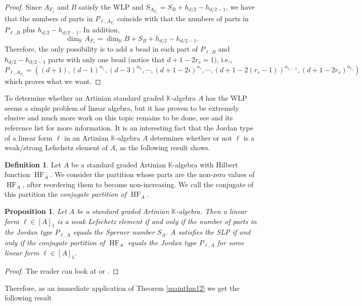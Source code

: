 \documentclass[12pt,twoside]{amsart}
\numberwithin{equation}{section} \hyphenation{semi-stable}
\newcommand{\K}{\mathbb{K}}
\DeclareMathOperator{\HF}{HF}
\newtheorem{proposition}[theorem]{Proposition}
\theoremstyle{definition}
\newtheorem{definition}[theorem]{Definition}
\begin{document}
\begin{proof}
Since $A_{F_s}$ and $B$ satisfy the WLP and $S_{A_{F_s}}= S_B+ h_{d/2}-h_{d/2 -1}$, we have that the numbers of parts in $P_{\ell, A_{F_s}}$
coincide with that the numbers of parts in $P_{\ell, B}$ plus $h_{d/2}-h_{d/2 -1}$. In addition,
$$
\dim _{\K}A_{F_s}=\dim_{\K}B+S_B+  h_{d/2}-h_{d/2 -1}.$$
Therefore, the only possibility is to add a bead in each part of $ P_{\ell,B}$ and $h_{d/2}-h_{d/2 -1}$ parts with only one bead (notice that $d+1-2r_s=1)$, i.e.,
$$ P_{\ell,A_{F_s}}= ((d+1), (d-1)^{\alpha_1},(d - 3)^{\alpha_2},\cdots,  (d+1-2i)^{\alpha _i}, \cdots , (d+1-2(r_s-1))^{\alpha_{r_s-1}},(d+1-2r_s)^{\alpha_{r_s}})$$
which proves what we want.
\end{proof}

To determine whether an Artinian standard graded $\K$-algebra $A$ has the WLP seems a simple problem of linear algebra, but it has proven to be extremely elusive and much more work on this topic remains to be done, see \cite{JMR} and its reference list for more information. 
It is an interesting fact that the Jordan type of a linear form $\ell$ in an Artinian $\K$-algebra $A$ determines whether or not $\ell$ is a weak/strong Lefschetz element of $A$, as the following result shows.

\begin{definition}
    Let $A$ be a standard graded Artinian $\K$-algebra with Hilbert function $\HF_A$. We consider the partition whose parts are the non-zero values of $\HF_A$, after reordering them to become non-increasing. We call the conjugate of this partition the \emph{conjugate partition of $\HF_A$}.
\end{definition}

\begin{proposition}\label{jordanTypeWLP}
    Let $A$ be a standard graded Artinian $\K$-algebra. Then a linear form $\ell \in [A]_1$ is a weak Lefschetz element if and only if the number of parts in the Jordan type $P_{\ell,A}$ equals the Sperner number $S_A$.
   $A$  satisfies the SLP if and only if the conjugate partition
of $\HF_A$ equals the Jordan type $P_{\ell,A}$ for some
linear form $\ell \in [A]_1$.
\end{proposition}
\begin{proof}
The reader can look at  \cite[Remark 3 and Proposition 14]{HW} or \cite[Proposition 3.64]{HMMNWW}.   
\end{proof}

Therefore, as an immediate application of Theorem \ref{mainthm12} we get the following result
\end{document}
